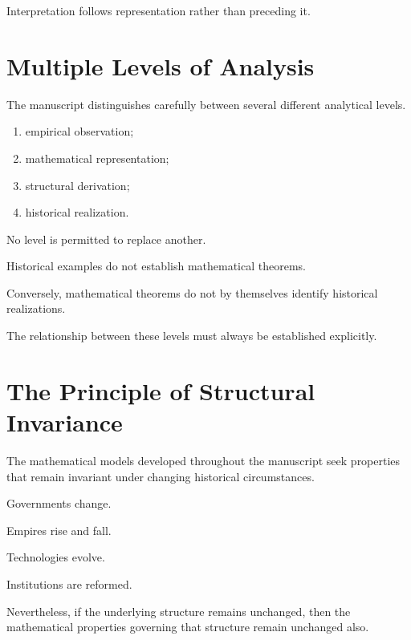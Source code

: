 \documentclass[11pt,openany]{book}
\theoremstyle{plain}
\theoremstyle{definition}
\begin{document}
Interpretation follows representation rather than preceding it.


\section*{Multiple Levels of Analysis}

The manuscript distinguishes carefully between several different analytical levels.

\begin{enumerate}

\item empirical observation;

\item mathematical representation;

\item structural derivation;

\item historical realization.

\end{enumerate}

No level is permitted to replace another.

Historical examples do not establish mathematical theorems.

Conversely, mathematical theorems do not by themselves identify historical realizations.

The relationship between these levels must always be established explicitly.


\section*{The Principle of Structural Invariance}

The mathematical models developed throughout the manuscript seek properties that remain invariant under changing historical circumstances.

Governments change.

Empires rise and fall.

Technologies evolve.

Institutions are reformed.

Nevertheless, if the underlying structure remains unchanged, then the mathematical properties governing that structure remain unchanged also.
\end{document}
